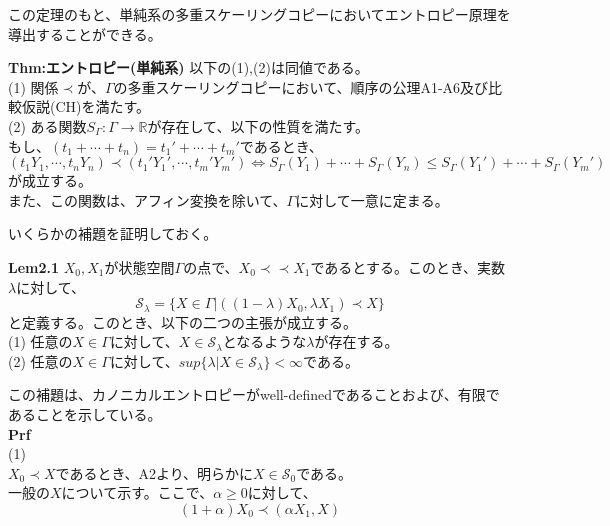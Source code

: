 \documentclass[a4paper,11pt]{jsarticle}
\numberwithin{equation}{section}
\begin{document}
この定理のもと、単純系の多重スケーリングコピーにおいてエントロピー原理を導出することができる。\\
\begin{itembox}[l]{\textbf{Thm:エントロピー(単純系)}}
    以下の(1),(2)は同値である。\\
    (1) 関係$\prec$が、$\Gamma$の多重スケーリングコピーにおいて、順序の公理A1-A6及び比較仮説(CH)を満たす。\\
    (2) ある関数$S_{\Gamma}:\Gamma \rightarrow \mathbb{R}$が存在して、以下の性質を満たす。\\
    もし、$(t_1+ \cdots +t_n)=t_1'+ \cdots +t_m'$であるとき、
    \begin{equation}
        (t_1 Y_1, \cdots ,t_n Y_n) \prec (t_1' Y_1', \cdots ,t_m' Y_m') \Leftrightarrow S_{\Gamma}(Y_1)+ \cdots +S_{\Gamma}(Y_n) \leq S_{\Gamma}(Y_1')+ \cdots +S_{\Gamma}(Y_m')
    \end{equation}
    が成立する。\\
    また、この関数は、アフィン変換を除いて、$\Gamma$に対して一意に定まる。

\end{itembox}
いくらかの補題を証明しておく。\\
\begin{itembox}[l]{\textbf{Lem2.1}}
$X_0,X_1$が状態空間$\Gamma$の点で、$X_0 \prec \prec X_1$であるとする。このとき、実数$\lambda$に対して、
\begin{equation}
    \mathcal{S}_{\lambda} = \{X\in \Gamma|((1-\lambda)X_0,\lambda X_1) \prec X \}
\end{equation}
と定義する。このとき、以下の二つの主張が成立する。\\
(1) 任意の$X \in \Gamma$に対して、$X \in \mathcal{S}_{\lambda}$となるような$\lambda$が存在する。\\
(2) 任意の$X \in \Gamma$に対して、$sup\{\lambda|X \in \mathcal{S}_{\lambda}\}<\infty$である。

\end{itembox}
この補題は、カノニカルエントロピーがwell-definedであることおよび、有限であることを示している。\\
\textbf{Prf}\\
(1) \\
$X_0 \prec X$であるとき、A2より、明らかに$X \in \mathcal{S}_0$である。\\
一般の$X$について示す。ここで、$\alpha \geq 0$に対して、
\begin{equation}
    (1+\alpha)X_0 \prec (\alpha X_1,X)
\end{equation}
\end{document}
